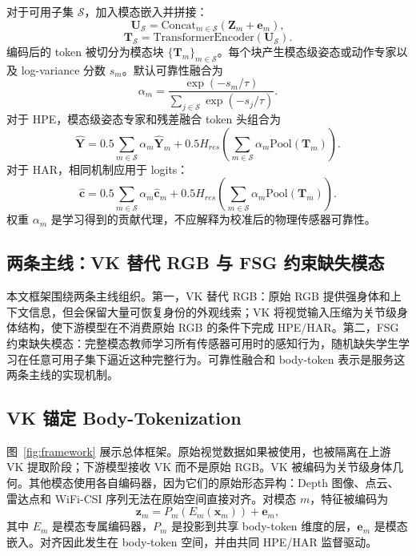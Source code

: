 ﻿\documentclass[UTF8,twocolumn]{ctexart}
\begin{document}
对于可用子集 $\mathcal{S}$，加入模态嵌入并拼接：
\begin{equation}
    \mathbf{U}_{\mathcal{S}}=\mathrm{Concat}_{m\in\mathcal{S}}(\mathbf{Z}_{m}+\mathbf{e}_{m}),
\end{equation}
\begin{equation}
    \mathbf{T}_{\mathcal{S}}=\mathrm{TransformerEncoder}(\mathbf{U}_{\mathcal{S}}).
\end{equation}
编码后的 token 被切分为模态块 $\{\mathbf{T}_m\}_{m\in\mathcal{S}}$。每个块产生模态级姿态或动作专家以及 log-variance 分数 $s_m$。默认可靠性融合为
\begin{equation}
    \alpha_m=\frac{\exp(-s_m/\tau)}{\sum_{j\in\mathcal{S}}\exp(-s_j/\tau)}.
\end{equation}
对于 HPE，模态级姿态专家和残差融合 token 头组合为
\begin{equation}
    \hat{\mathbf{Y}}=0.5\sum_{m\in\mathcal{S}}\alpha_m\hat{\mathbf{Y}}_m+
    0.5H_{res}\left(\sum_{m\in\mathcal{S}}\alpha_m\mathrm{Pool}(\mathbf{T}_m)\right).
\end{equation}
对于 HAR，相同机制应用于 logits：
\begin{equation}
    \hat{\mathbf{c}}=0.5\sum_{m\in\mathcal{S}}\alpha_m\hat{\mathbf{c}}_m+
    0.5H_{res}\left(\sum_{m\in\mathcal{S}}\alpha_m\mathrm{Pool}(\mathbf{T}_m)\right).
\end{equation}
权重 $\alpha_m$ 是学习得到的贡献代理，不应解释为校准后的物理传感器可靠性。

\subsection{两条主线：VK 替代 RGB 与 FSG 约束缺失模态}
本文框架围绕两条主线组织。第一，VK 替代 RGB：原始 RGB 提供强身体和上下文信息，但会保留大量可恢复身份的外观线索；VK 将视觉输入压缩为关节级身体结构，使下游模型在不消费原始 RGB 的条件下完成 HPE/HAR。第二，FSG 约束缺失模态：完整模态教师学习所有传感器可用时的感知行为，随机缺失学生学习在任意可用子集下逼近这种完整行为。可靠性融合和 body-token 表示是服务这两条主线的实现机制。

\subsection{VK 锚定 Body-Tokenization}
图~\ref{fig:framework} 展示总体框架。原始视觉数据如果被使用，也被隔离在上游 VK 提取阶段；下游模型接收 VK 而不是原始 RGB。VK 被编码为关节级身体几何。其他模态使用各自编码器，因为它们的原始形态异构：Depth 图像、点云、雷达点和 WiFi-CSI 序列无法在原始空间直接对齐。对模态 $m$，特征被编码为
\begin{equation}
    \mathbf{z}_{m}=P_m(E_m(\mathbf{x}_{m}))+\mathbf{e}_{m},
\end{equation}
其中 $E_m$ 是模态专属编码器，$P_m$ 是投影到共享 body-token 维度的层，$\mathbf{e}_{m}$ 是模态嵌入。对齐因此发生在 body-token 空间，并由共同 HPE/HAR 监督驱动。
\end{document}

